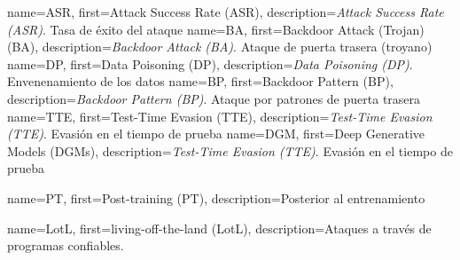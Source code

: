               {name={ASR},    first={Attack Success Rate (ASR)},      description={\textit{Attack Success Rate (ASR)}. Tasa de éxito del ataque}}
               {name={BA},     first={Backdoor Attack (Trojan) (BA)},  description={\textit{Backdoor Attack (BA)}. Ataque de puerta trasera (troyano)}}
               {name={DP},     first={Data Poisoning (DP)},            description={\textit{Data Poisoning (DP)}. Envenenamiento de los datos}}
      {name={BP},     first={Backdoor Pattern (BP)},          description={\textit{Backdoor Pattern (BP)}. Ataque por patrones de puerta trasera}}
              {name={TTE},    first={Test-Time Evasion (TTE)},        description={\textit{Test-Time Evasion (TTE)}. Evasión en el tiempo de prueba}}
              {name={DGM},    first={Deep Generative Models (DGMs)},  description={\textit{Test-Time Evasion (TTE)}. Evasión en el tiempo de prueba}}




  {name={PT}, first={Post-training (PT)},   description={Posterior al entrenamiento}}


  {name={LotL}, first={living-off-the-land (LotL)},   description={Ataques a través de programas confiables.}}

